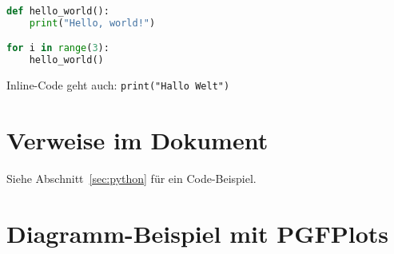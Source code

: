\documentclass[a4paper,12pt]{article}
\begin{document}
\begin{lstlisting}[language=Python, caption={Hello World Beispiel}]
def hello_world():
    print("Hello, world!")

for i in range(3):
    hello_world()
\end{lstlisting}

Inline-Code geht auch: \lstinline{print("Hallo Welt")}

\section{Verweise im Dokument}
Siehe Abschnitt~\ref{sec:python} für ein Code-Beispiel.

\section{Diagramm-Beispiel mit PGFPlots}
\end{document}
